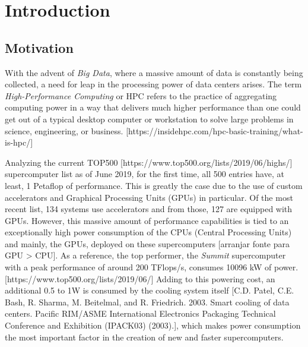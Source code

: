 
\chapter{Introduction}
\label{chapter:introduction}


\section{Motivation}
\label{section:motivation}

With the advent of \textit{Big Data}, where a massive amount of data is constantly being collected, a need for leap in the processing power of data centers arises. The term \textit{High-Performance Computing} or HPC refers to the practice of aggregating computing power in a way that delivers much higher performance than one could get out of a typical desktop computer or workstation to solve large problems in science, engineering, or business. [https://insidehpc.com/hpc-basic-training/what-is-hpc/] 

Analyzing the current TOP500 [https://www.top500.org/lists/2019/06/highs/]  supercomputer list as of June 2019, for the first time, all 500 entries have, at least, 1 Petaflop of performance. This is greatly the case due to the use of custom accelerators and Graphical Processing Units (GPUs) in particular. Of the most recent list, 134 systems use accelerators and from those, 127 are equipped with GPUs. However, this massive amount of performance capabilities is tied to an exceptionally high power consumption of the CPUs (Central Processing Units) and mainly, the GPUs, deployed on these supercomputers [arranjar fonte para GPU > CPU]. As a reference, the top performer, the \textit{Summit} supercomputer with a peak performance of around 200 TFlops/s, consumes 10096 kW of power. [https://www.top500.org/lists/2019/06/] Adding to this powering cost, an additional 0.5 to 1W is consumed by the cooling system itself [C.D. Patel, C.E. Bash, R. Sharma, M. Beitelmal, and R. Friedrich. 2003. Smart cooling of data centers. Pacific RIM/ASME International Electronics Packaging Technical Conference and Exhibition (IPACK03) (2003).], which makes power consumption the most important factor in the creation of new and faster supercomputers.

